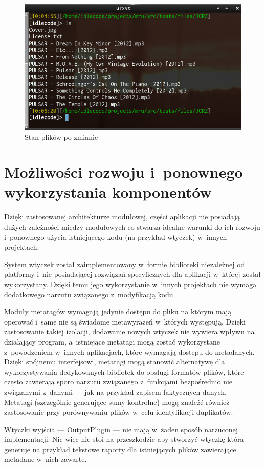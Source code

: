 \begin{figure}[h]
\begin{center}
\includegraphics[scale=0.70]{img/test_after.png}
\end{center}
\caption{Stan plików po zmianie}
\end{figure}

\section{Możliwości rozwoju i~ponownego wykorzystania komponentów}
\par
Dzięki zastosowanej architekturze modułowej, części aplikacji nie posiadają dużych zależności między-modułowych co stwarza idealne warunki do ich rozwoju i~ponownego użycia istniejącego kodu (na przykład wtyczek) w~innych projektach.

\par
System wtyczek został zaimplementowany w~formie biblioteki niezależnej od platformy i~nie posiadającej rozwiązań specyficznych dla aplikacji w~której został wykorzystany. Dzięki temu jego wykorzystanie w~innych projektach nie wymaga dodatkowego narzutu związanego z~modyfikacją kodu.

\par
Moduły metatagów wymagają jedynie dostępu do pliku na którym mają operować i~same nie są świadome metawyrażeń w~których występują. Dzięki zastosowanie takiej izolacji, dodawanie nowych wtyczek nie wywiera wpływu na działający program, a~istniejące metatagi mogą zostać wykorzystane z~powodzeniem w~innych aplikacjach, które wymagają dostępu do metadanych. Dzięki spójnemu interfejsowi, metatagi mogą stanowić alternatywę dla wykorzystywania dedykowanych bibliotek do obsługi formatów plików, które często zawierają sporo narzutu związanego z~funkcjami bezpośrednio nie związanymi z~danymi --- jak na przykład zapisem faktycznych danych.\\
Metatagi (szczególnie generujące sumy kontrolne) mogą znaleźć również zastosowanie przy porównywaniu plików w~celu identyfikacji duplikatów.

\par
Wtyczki wyjścia --- OutputPlugin --- nie mają w~żaden sposób narzuconej implementacji.
Nic więc nie stoi na przeszkodzie aby stworzyć wtyczkę która generuje na przykład tekstowe raporty dla istniejących plików zawierające metadane w~nich zawarte.

